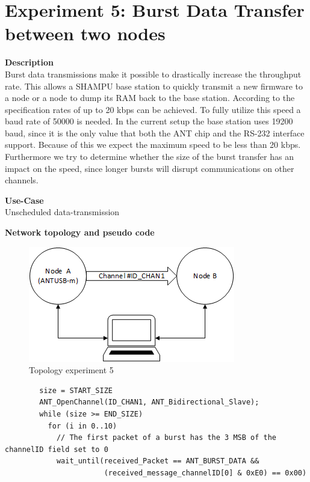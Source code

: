 \section{Experiment 5: Burst Data Transfer between two nodes}
\begin{description} 
	\item{\textbf{Description}} \hfill \\ Burst data transmissions make it possible to drastically increase the throughput rate. This allows a SHAMPU base station to quickly transmit a new firmware to a node or a node to dump its RAM back to the base station.	According to the specification rates of up to 20 kbps can be achieved. To fully utilize this speed a baud rate of 50000 is needed\cite{BurstMax}. In the current setup the base station uses 19200 baud, since it is the only value that both the ANT chip and the RS-232 interface support. Because of this we expect the maximum speed to be less than 20 kbps. Furthermore we try to determine whether the size of the burst transfer has an impact on the speed, since longer bursts will disrupt communications on other channels.
	\item{\textbf{Use-Case}} \hfill \\ Unscheduled data-transmission
	\item{\textbf{Network topology and pseudo code}} \hfill \\ 
	\begin{figure}[H]
		\centering
		\includegraphics[scale=1]{content/images/exp5_topo.png}
		\caption{Topology experiment 5}
	\end{figure}
	\begin{code}[H]
		\begin{verbatim}
		size = START_SIZE
		ANT_OpenChannel(ID_CHAN1, ANT_Bidirectional_Slave);		
		while (size >= END_SIZE)
		  for (i in 0..10) 
		    // The first packet of a burst has the 3 MSB of the channelID field set to 0
		    wait_until(received_Packet == ANT_BURST_DATA && 
		               (received_message_channelID[0] & 0xE0) == 0x00)

\end{verbatim}
\end{code}
\end{description}
